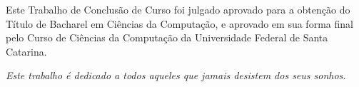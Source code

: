 \documentclass[
  12pt,       %
  openright,      %
  twoside,      %
  a4paper,      %
  english,      %
  french,       %
  spanish,      %
  brazil,       %
  ]{abntex2}
\begin{document}
%
% 
%
\begin{folhadeaprovacao}

  \begin{center}
    {\ABNTEXchapterfont\large\imprimirautor}

    \vspace*{\fill}\vspace*{\fill}
    {\ABNTEXchapterfont\bfseries\Large\imprimirtitulo}
    \vspace*{\fill}


    \vspace*{\fill}
   \end{center}

   Este Trabalho de Conclusão de Curso foi julgado aprovado para a
   obtenção do Título de Bacharel em Ciências da Computação, e
   aprovado em sua forma final pelo Curso de Ciências da Computação
   da Universidade Federal de Santa Catarina.


   \begin{center}
    \vspace*{0.5cm}
    {\large\imprimirlocal}
    \par
    {\large\imprimirdata}
    \vspace*{1cm}
  \end{center}

\end{folhadeaprovacao}

\begin{dedicatoria}
   \vspace*{\fill}
   \centering
   \noindent
   \textit{ Este trabalho é dedicado a todos aqueles que jamais desistem dos seus sonhos.} \vspace*{\fill}
\end{dedicatoria}
\end{document}
